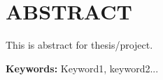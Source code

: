 \chapter*{ABSTRACT}
\thispagestyle{plain} 
This is abstract for thesis/project.
\par
\textbf{Keywords:} Keyword1, keyword2...
\newpage